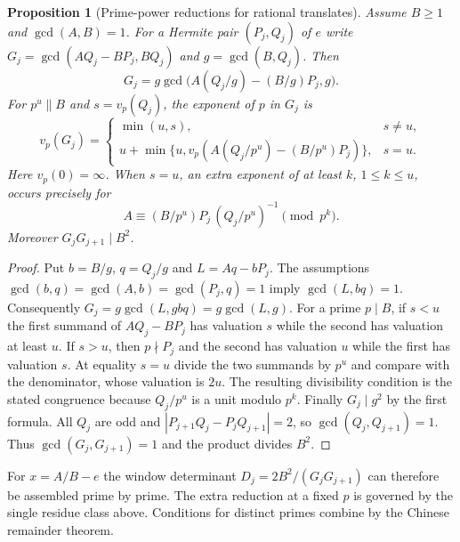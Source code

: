 \documentclass[11pt]{amsart}
\newtheorem{proposition}[theorem]{Proposition}
\theoremstyle{definition}
\theoremstyle{remark}
\numberwithin{equation}{section}
\begin{document}
\begin{proposition}[Prime-power reductions for rational translates]\label{prop:rational-gcd-valuations}
Assume $B\ge1$ and $\gcd(A,B)=1$. For a Hermite pair $(P_j,Q_j)$ of $e$ write
$G_j=\gcd(AQ_j-BP_j,BQ_j)$ and $g=\gcd(B,Q_j)$. Then
\[
G_j=g\gcd\bigl(A(Q_j/g)-(B/g)P_j,g\bigr).
\]
For $p^u\parallel B$ and $s=v_p(Q_j)$, the exponent of $p$ in $G_j$ is
\[
v_p(G_j)=
\begin{cases}
\min(u,s), & s\ne u,\\
u+\min\{u,v_p(A(Q_j/p^u)-(B/p^u)P_j)\}, & s=u .
\end{cases}
\]
Here $v_p(0)=\infty$. When $s=u$, an extra exponent of at least $k$,
$1\le k\le u$, occurs precisely for
\[
 A\equiv (B/p^u)P_j\,(Q_j/p^u)^{-1}\pmod{p^k}.
\]
Moreover $G_jG_{j+1}\mid B^2$.
\end{proposition}
\begin{proof}
Put $b=B/g$, $q=Q_j/g$ and $L=Aq-bP_j$. The assumptions
$\gcd(b,q)=\gcd(A,b)=\gcd(P_j,q)=1$ imply $\gcd(L,bq)=1$.
Consequently $G_j=g\gcd(L,g b q)=g\gcd(L,g)$. For a prime $p\mid B$,
if $s<u$ the first summand of $AQ_j-BP_j$ has valuation $s$ while the
second has valuation at least $u$. If $s>u$, then $p\nmid P_j$ and the
second has valuation $u$ while the first has valuation $s$. At equality
$s=u$ divide the two summands by $p^u$ and compare with the denominator,
whose valuation is $2u$. The resulting divisibility condition is the
stated congruence because $Q_j/p^u$ is a unit modulo $p^k$.
Finally $G_j\mid g^2$ by the first formula. All $Q_j$ are odd and
$|P_{j+1}Q_j-P_jQ_{j+1}|=2$, so $\gcd(Q_j,Q_{j+1})=1$.
Thus $\gcd(G_j,G_{j+1})=1$ and the product divides $B^2$.
\end{proof}
For $x=A/B-e$ the window determinant $D_j=2B^2/(G_jG_{j+1})$
can therefore be assembled prime by prime. The extra reduction at a fixed
$p$ is governed by the single residue class above. Conditions for distinct
primes combine by the Chinese remainder theorem.
\end{document}
